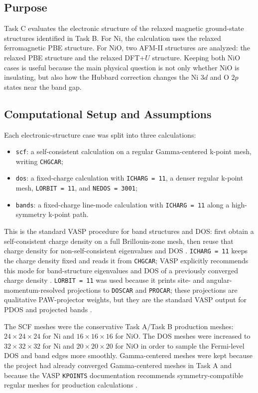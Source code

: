 \subsection{Purpose}

Task C evaluates the electronic structure of the relaxed magnetic ground-state
structures identified in Task B.  For Ni, the calculation uses the relaxed
ferromagnetic PBE structure.  For NiO, two AFM-II structures are analyzed: the
relaxed PBE structure and the relaxed DFT+\(U\) structure.  Keeping both NiO
cases is useful because the main physical question is not only whether NiO is
insulating, but also how the Hubbard correction changes the Ni \(3d\) and O
\(2p\) states near the band gap.

\subsection{Computational Setup and Assumptions}

Each electronic-structure case was split into three calculations:
\begin{itemize}
  \item \texttt{scf}: a self-consistent calculation on a regular
  Gamma-centered k-point mesh, writing \texttt{CHGCAR};
  \item \texttt{dos}: a fixed-charge calculation with \texttt{ICHARG = 11},
  a denser regular k-point mesh, \texttt{LORBIT = 11}, and
  \texttt{NEDOS = 3001};
  \item \texttt{bands}: a fixed-charge line-mode calculation with
  \texttt{ICHARG = 11} along a high-symmetry k-point path.
\end{itemize}

This is the standard VASP procedure for band structures and DOS: first obtain a
self-consistent charge density on a full Brillouin-zone mesh, then reuse that
charge density for non-self-consistent eigenvalues and DOS
\cite{vasp-band-structure,vasp-icharg}.  \texttt{ICHARG = 11} keeps the charge
density fixed and reads it from \texttt{CHGCAR}; VASP explicitly recommends
this mode for band-structure eigenvalues and DOS of a previously converged
charge density \cite{vasp-icharg}.  \texttt{LORBIT = 11} was used because it
prints site- and angular-momentum-resolved projections to \texttt{DOSCAR} and
\texttt{PROCAR}; these projections are qualitative PAW-projector weights, but
they are the standard VASP output for PDOS and projected bands
\cite{vasp-lorbit,vasp-doscar,vasp-procar}.

The SCF meshes were the conservative Task A/Task B production meshes:
\(24\times24\times24\) for Ni and \(16\times16\times16\) for NiO.  The DOS
meshes were increased to \(32\times32\times32\) for Ni and
\(20\times20\times20\) for NiO in order to sample the Fermi-level DOS and band
edges more smoothly.  Gamma-centered meshes were kept because the project had
already converged Gamma-centered meshes in Task A and because the VASP
\texttt{KPOINTS} documentation recommends symmetry-compatible regular meshes
for production calculations \cite{vasp-kpoints}.

